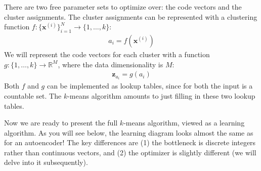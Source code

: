 There are two free parameter sets to optimize over: the code vectors and the cluster assignments. The cluster assignments can be represented with a clustering function $f: \{\mathbf{x}^{(i)}\}_{i=1}^N \rightarrow \{1,\dots,k\}$:
\begin{align}
    a_i = f(\mathbf{x}^{(i)})
\end{align}
We will represent the code vectors for each cluster with a function $g: \{1,\ldots,k\} \rightarrow \mathbb{R}^M$, where the data dimensionality is $M$:
\begin{align}
    \mathbf{z}_{a_i} = g(a_i)
\end{align}
Both $f$ and $g$ can be implemented as lookup tables, since for both the input is a countable set. The $k$-means algorithm amounts to just filling in these two lookup tables.

Now we are ready to present the full $k$-means algorithm, viewed as a learning algorithm. As you will see below, the learning diagram looks almost the same as for an autoencoder! The key differences are (1) the bottleneck is discrete integers rather than continuous vectors, and (2) the optimizer is slightly different (we will delve into it subsequently).%



